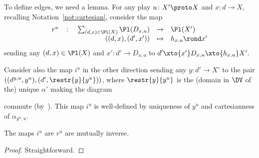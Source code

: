 \documentclass{LMCS}
\theoremstyle{plain}\newtheorem{satz}[thm]{Satz}
\begin{document}
To define edges, we need a lemma. For any play $u \colon X' \proto X$
and $x \colon d \to X$, recalling Notation~\ref{not:cartesian},
consider the map $$
\begin{array}[t]{ccrcl}
r^u & \colon & \sum_{(d,x) \in \Pl (X)} \Pl (D_{x,u}) & \to & \Pl (X') \\
&& ((d,x),(d',x')) & \mapsto & h_{x,u} \rond x'
\end{array}$$
 sending any $(d,x) \in \Pl (X)$ and $x' \colon d' \to D_{x,u}$ to
$d' \xto{x'} D_{x,u} \xto{h_{x,u}} X'.$

Consider also the map $i^u$ in the other direction sending any $y
\colon d' \to X'$ to the pair $((d^{y,u}, y^u), (d',
\restr{y}{y^u}))$, where $\restr{y}{y^u}$ is the (domain in $\DV$ of
the) unique $\alpha'$ making the diagram
\begin{center}
\end{center}
commute (by~).  This map $i^u$ is well-defined by
uniqueness of $y^u$ and cartesianness of $\alpha_{y^u,u}$.
\begin{lem}\label{lem:ru}
The maps $i^u$ are $r^u$ are mutually inverse.
\end{lem}
\begin{proof}
  Straightforward.
\end{proof}
\end{document}
